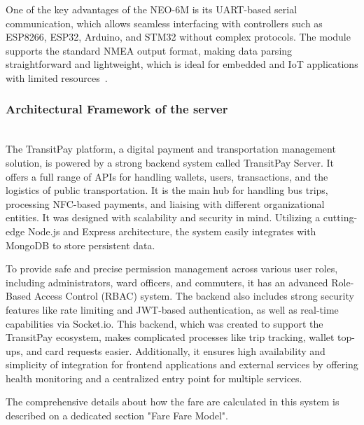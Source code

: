 \documentclass[sigconf, nonacm]{acmart}
\begin{document}
One of the key advantages of the NEO-6M is its UART-based serial communication, which allows seamless interfacing with controllers such as ESP8266, ESP32, Arduino, and STM32 without complex protocols. The module supports the standard NMEA output format, making data parsing straightforward and lightweight, which is ideal for embedded and IoT applications with limited resources~\cite{gpsneo6m}.


\subsubsection{Architectural Framework of the server}  \mbox{} \\

The TransitPay platform, a digital payment and transportation management solution, is powered by a strong backend system called TransitPay Server. It offers a full range of APIs for handling wallets, users, transactions, and the logistics of public transportation. It is the main hub for handling bus trips, processing NFC-based payments, and liaising with different organizational entities. It was designed with scalability and security in mind. Utilizing a cutting-edge Node.js and Express architecture, the system easily integrates with MongoDB to store persistent data.

To provide safe and precise permission management across various user roles, including administrators, ward officers, and commuters, it has an advanced Role-Based Access Control (RBAC) system. The backend also includes strong security features like rate limiting and JWT-based authentication, as well as real-time capabilities via Socket.io. This backend, which was created to support the TransitPay ecosystem, makes complicated processes like trip tracking, wallet top-ups, and card requests easier. Additionally, it ensures high availability and simplicity of integration for frontend applications and external services by offering health monitoring and a centralized entry point for multiple services.

The comprehensive details about how the fare are calculated in this system is described on a dedicated section "Fare Fare Model".
\end{document}
